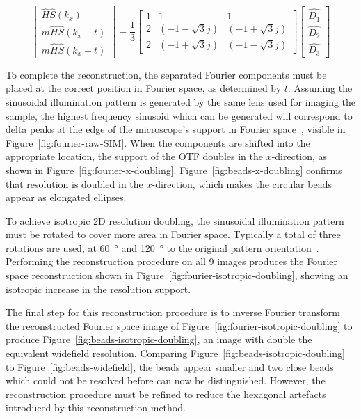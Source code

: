 \begin{equation} \label{eq:matrix-solved}
\begin{bmatrix} \hat{H}\hat{S}\left(k_x\right) \\ m\hat{H}\hat{S}\left(k_x+t\right) \\ m\hat{H}\hat{S}\left(k_x-t\right) \end{bmatrix} =
\frac{1}{3} \begin{bmatrix}
1 & 1 & 1 \\
2 & \left(-1 -\sqrt{3}j\right) & \left(-1+\sqrt{3}j\right) \\
2 & \left(-1 +\sqrt{3}j\right) & \left(-1 -\sqrt{3}j\right)
\end{bmatrix}
\begin{bmatrix} \hat{D_1} \\ \hat{D_2} \\ \hat{D_3} \end{bmatrix}
\end{equation}

To complete the reconstruction, the separated Fourier components must be placed at the correct position in Fourier space, as determined by $t$.
Assuming the sinusoidal illumination pattern is generated by the same lens used for imaging the sample, the highest frequency sinusoid which can be generated will correspond to delta peaks at the edge of the microscope's support in Fourier space~\cite{heintzmann2017super}, visible in Figure~\ref{fig:fourier-raw-SIM}.
When the components are shifted into the appropriate location, the support of the OTF doubles in the $x$-direction, as shown in Figure~\ref{fig:fourier-x-doubling}.
Figure~\ref{fig:beads-x-doubling} confirms that resolution is doubled in the $x$-direction, which makes the circular beads appear as elongated ellipses.

To achieve isotropic 2D resolution doubling, the sinusoidal illumination pattern must be rotated to cover more area in Fourier space.
Typically a total of three rotations are used, at \SI{60}{\degree} and \SI{120}{\degree} to the original pattern orientation~\cite{gustafsson2000surpassing, chang2009isotropic}.
Performing the reconstruction procedure on all 9 images produces the Fourier space reconstruction shown in Figure~\ref{fig:fourier-isotropic-doubling}, showing an isotropic increase in the resolution support.


The final step for this reconstruction procedure is to inverse Fourier transform the reconstructed Fourier space image of Figure~\ref{fig:fourier-isotropic-doubling} to produce Figure~\ref{fig:beads-isotropic-doubling}, an image with double the equivalent widefield resolution.
Comparing Figure~\ref{fig:beads-isotropic-doubling} to Figure~\ref{fig:beads-widefield}, the beads appear smaller and two close beads which could not be resolved before can now be distinguished.
However, the reconstruction procedure must be refined to reduce the hexagonal artefacts introduced by this reconstruction method.

